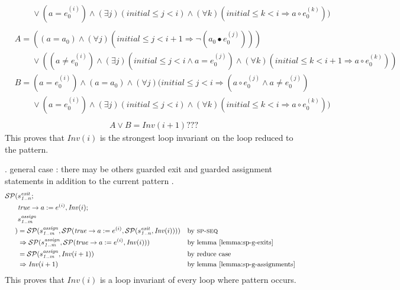 \documentclass[a4paper,10pt]{article}
\newcommand{\idx}{\ensuremath{i}\xspace}
\newcommand{\idxinitial}{\ensuremath{\mathit{initial}}\xspace}
\newcommand{\at}[1]{{(#1)}}
\newcommand{\impl}{\ensuremath{\Longrightarrow}}
\newcommand{\Inv}[1]{\ensuremath{\mathit{Inv}(#1)\xspace}}
\newcommand{\gstatement}[2]{\ensuremath{s^{\mathit{#1}}_{\mathit{#2}}\xspace}}
\newcommand{\spseq}{\textsc{sp-seq}\xspace}
\newenvironment{proof}[1][Proof.]{\begin{trivlist}
\item[\hskip \labelsep {\bfseries #1}]}{\end{trivlist}}
\begin{document}
\begin{proof}
\begin{align*}
    &\phantom{B=} 
       \lor (a = e_0^\at{\idx}) \land (\exists j)(\idxinitial \leq j < \idx ) \land (\forall k)(\idxinitial \leq k < \idx \impl a \circ e_0^\at{k})) \\
  \end{align*}
  \begin{align*}
    &A= ((a = a_0) \land (\forall j)(\idxinitial \leq j < \idx+1 \impl \neg (a_0 \bullet e_0^\at{j}))) \\
    &\phantom{A=} 
       \lor ((a \neq e_0^\at{\idx}) \land (\exists j)(\idxinitial \leq j < \idx \land a = e_0^\at{j}) \land 
        (\forall k)(\idxinitial \leq k < \idx+1 \impl a \circ e_0^\at{k})) \\           
    &B= (a = e_0^\at{\idx}) \land (a =a_0) \land (\forall j)(\idxinitial \leq j < \idx \impl (a \circ e_0^\at{j} \land a \neq e_0^\at{j}) \\
    &\phantom{B=} 
       \lor (a = e_0^\at{\idx}) \land (\exists j)(\idxinitial \leq j < \idx ) \land (\forall k)(\idxinitial \leq k < \idx \impl a \circ e_0^\at{k})) \\
  \end{align*}
  \begin{align*}
    A \lor B  = \Inv{\idx+1} ???
  \end{align*}
  This proves that \Inv{\idx} is the strongest loop invariant on the 
  loop reduced to the pattern. 

. general case : there may be others guarded exit and guarded assignment statements
                  in addition to the current pattern \curpattern.\\
  \begin{align*}
    \spost{
      &\gstatement{exit}{1..n};\\
      &\mathit{true} \rightarrow a := e^\at{\idx}}{\Inv{\idx};\\
      &\gstatement{assign}{1..m}\\
    }
    &= \spost{\gstatement{assign}{1..m}}{\spost{\mathit{true} \rightarrow a := e^\at{\idx}}
        {\spost{\gstatement{exit}{1..n}}{\Inv{\idx}}}} && \text{by \spseq} \\ 
    &\Rightarrow \spost{\gstatement{assign}{1..m}}
        {\spost{\mathit{true} \rightarrow a := e^\at{\idx}}{\Inv{\idx}}} && \text{by lemma \ref{lemma:sp-g-exits}} \\ 
    &= \spost{\gstatement{assign}{1..m}}{\Inv{\idx+1}} && \text{by reduce case} \\ 
    &\Rightarrow \Inv{\idx+1} && \text{by lemma \ref{lemma:sp-g-assignments}}
  \end{align*}
  This proves that \Inv{\idx} is a loop invariant of every loop where pattern
  \curpattern occurs.
\end{proof}
\end{document}
